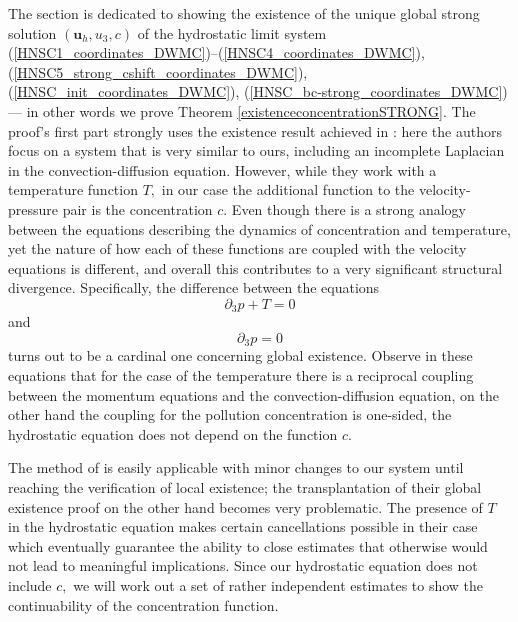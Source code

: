 \documentclass[12pt]{report}
\numberwithin{theorem}{chapter}
\numberwithin{corollary}{chapter}
\numberwithin{lemma}{chapter}
\numberwithin{remark}{chapter}
\numberwithin{definition}{chapter}
\numberwithin{prop}{chapter}
\begin{document}
The section is dedicated to showing the existence of the unique global strong solution $(\mathbf{u}_h, u_3, c)$ of the hydrostatic limit system (\ref{HNSC1_coordinates_DWMC})--(\ref{HNSC4_coordinates_DWMC}), (\ref{HNSC5_strong_cshift_coordinates_DWMC}), (\ref{HNSC_init_coordinates_DWMC}), (\ref{HNSC_bc-strong_coordinates_DWMC}) --- in other words we prove Theorem \ref{existenceconcentrationSTRONG}. The proof's first part strongly uses the existence result achieved in \cite{cao2014local}: here the authors focus on a system that is very similar to ours, including an incomplete Laplacian in the convection-diffusion equation. However, while they work with a temperature function $T,$ in our case the additional function to the velocity-pressure pair is the concentration $c.$ Even though there is a strong analogy between the equations describing the dynamics of concentration and temperature, yet the nature of how each of these functions are coupled with the velocity equations is different, and overall this contributes to a very significant structural divergence. Specifically, the difference between the equations $$ \partial_3 p + T = 0$$ and $$ \partial_3 p = 0$$ turns out to be a cardinal one concerning global existence. Observe in these equations that for the case of the temperature there is a reciprocal coupling between the momentum equations and the convection-diffusion equation, on the other hand the coupling for the pollution concentration is one-sided, the hydrostatic equation does not depend on the function $c.$

The method of \cite{cao2014local} is easily applicable with minor changes to our system until reaching the verification of local existence; the transplantation of their global existence proof on the other hand becomes very problematic. The presence of $T$ in the hydrostatic equation makes certain cancellations possible in their case which eventually guarantee the ability to close estimates that otherwise would not lead to meaningful implications. Since our hydrostatic equation does not include $c,$ we will work out a set of rather independent estimates to show the continuability of the concentration function.
\end{document}
